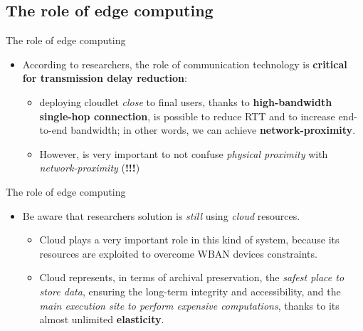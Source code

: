 \documentclass[10pt]{beamer}
\begin{document}
\subsection{The role of edge computing}
\begin{frame}{The role of edge computing} 

\begin{itemize}

\item According to researchers, the role of communication technology is \textbf{critical for transmission delay reduction}:

\begin{itemize}
\item deploying cloudlet \textit{close} to final users, thanks to \textbf{high-bandwidth single-hop connection}, is possible to reduce RTT and to increase end-to-end bandwidth; in other words, we can achieve \textbf{network-proximity}.\citep{TheSeminalRoleEdgeNativeApplications}

\item However, is very important to not confuse \textit{physical proximity} with \textit{network-proximity} (\textbf{!!!})
\end{itemize}

\end{itemize}

\end{frame} 
\begin{frame}{The role of edge computing} 

\begin{itemize}

\item Be aware that researchers solution is \textit{still} using \textit{cloud} resources.

\begin{itemize}
\item Cloud plays a very important role in this kind of system, because its resources are exploited to overcome WBAN devices constraints.
\item Cloud represents, in terms of archival preservation, the \textit{safest place to store data}, ensuring the long-term integrity and accessibility, and the \textit{main execution site to perform expensive computations}, thanks to its almost unlimited \textbf{elasticity}.
\end{itemize}

\end{itemize}

\end{frame} 
\end{document}
